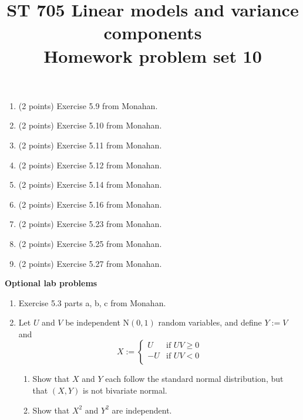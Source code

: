 \documentclass[11pt]{article}
\title{ST 705 Linear models and variance components \\ 
        Homework problem set 10}
\begin{document}
\maketitle

\begin{enumerate}

\item(2 points) Exercise 5.9 from Monahan.

\item(2 points) Exercise 5.10 from Monahan.

\item(2 points) Exercise 5.11 from Monahan.

\item(2 points) Exercise 5.12 from Monahan.

\item(2 points) Exercise 5.14 from Monahan.

\item(2 points) Exercise 5.16 from Monahan.

\item(2 points) Exercise 5.23 from Monahan.

\item(2 points) Exercise 5.25 from Monahan.

\item(2 points) Exercise 5.27 from Monahan.

\end{enumerate}

{\noindent\bf Optional lab problems}

\begin{enumerate}

\item Exercise 5.3 parts a, b, c from Monahan.

\item Let $U$ and $V$ be independent $\text{N}(0,1)$ random variables, and define $Y := V$ and 
\[
X := 
\begin{cases}
U & \text{if } UV \ge 0 \\
-U & \text{if } UV < 0 \\
\end{cases}
\]
\begin{enumerate}
\item Show that $X$ and $Y$ each follow the standard normal distribution, but that $(X, Y)$ is not bivariate normal.
\item Show that $X^{2}$ and $Y^{2}$ are independent.
\end{enumerate}

\end{enumerate}
\end{document}
